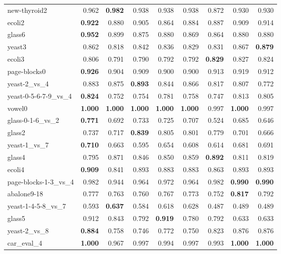 \begin{table}[!htbp]
{\begin{tabular}{lrrrrrrrr}
			new-thyroid2 & 0.962 & \textbf{0.982} & 0.938 & 0.938 & 0.938 & 0.872 & 0.930 & 0.930 \\
			ecoli2 & \textbf{0.922} & 0.880 & 0.905 & 0.864 & 0.884 & 0.887 & 0.909 & 0.914 \\
			glass6 & \textbf{0.952} & 0.899 & 0.875 & 0.880 & 0.869 & 0.864 & 0.880 & 0.880 \\
			yeast3 & 0.862 & 0.818 & 0.842 & 0.836 & 0.829 & 0.831 & 0.867 & \textbf{0.879} \\
			ecoli3 & 0.806 & 0.791 & 0.790 & 0.792 & 0.792 & \textbf{0.829} & 0.827 & 0.824 \\
			page-blocks0 & \textbf{0.926} & 0.904 & 0.909 & 0.900 & 0.900 & 0.913 & 0.919 & 0.912 \\
			yeast-2\_vs\_4 & 0.883 & 0.875 & \textbf{0.893} & 0.844 & 0.866 & 0.817 & 0.807 & 0.772 \\
			yeast-0-5-6-7-9\_vs\_4 & \textbf{0.824} & 0.752 & 0.754 & 0.781 & 0.758 & 0.747 & 0.813 & 0.805 \\
			vowel0 & \textbf{1.000} & \textbf{1.000} & \textbf{1.000} & \textbf{1.000} & \textbf{1.000} & 0.997 & \textbf{1.000} & 0.997 \\
			glass-0-1-6\_vs\_2 & \textbf{0.771} & 0.692 & 0.733 & 0.725 & 0.707 & 0.524 & 0.685 & 0.646 \\
			glass2 & 0.737 & 0.717 & \textbf{0.839} & 0.805 & 0.801 & 0.779 & 0.701 & 0.666 \\
			yeast-1\_vs\_7 & \textbf{0.710} & 0.663 & 0.595 & 0.654 & 0.608 & 0.614 & 0.681 & 0.691 \\
			glass4 & 0.795 & 0.871 & 0.846 & 0.850 & 0.859 & \textbf{0.892} & 0.811 & 0.819 \\
			ecoli4 & \textbf{0.909} & 0.841 & 0.893 & 0.883 & 0.883 & 0.863 & 0.893 & 0.893 \\
			page-blocks-1-3\_vs\_4 & 0.982 & 0.944 & 0.964 & 0.972 & 0.964 & 0.982 & \textbf{0.990} & \textbf{0.990} \\
			abalone9-18 & 0.777 & 0.763 & 0.760 & 0.767 & 0.773 & 0.752 & \textbf{0.817} & 0.792 \\
			yeast-1-4-5-8\_vs\_7 & 0.593 & \textbf{0.637} & 0.584 & 0.618 & 0.628 & 0.487 & 0.489 & 0.489 \\
			glass5 & 0.912 & 0.843 & 0.792 & \textbf{0.919} & 0.780 & 0.792 & 0.633 & 0.633 \\
			yeast-2\_vs\_8 & \textbf{0.884} & 0.758 & 0.746 & 0.772 & 0.750 & 0.823 & 0.876 & 0.876 \\
			car\_eval\_4 & \textbf{1.000} & 0.967 & 0.997 & 0.994 & 0.997 & 0.993 & \textbf{1.000} & \textbf{1.000} \\

\end{tabular}}
\end{table}
